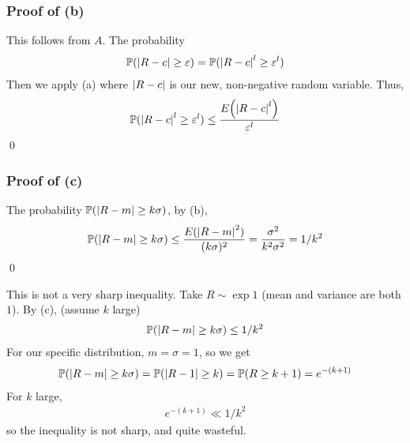 \subsubsection{Proof of (b)}
This follows from $A$. The probability
\begin{align}
    \mathbb{P}(\abs{R-c} \ge \varepsilon) = \mathbb{P}(\abs{R-c}^l \ge \varepsilon^l)
\end{align}
Then we apply (a) where $\abs{R - c}$ is our new, non-negative random variable. Thus,
\begin{align}
    \mathbb{P}(\abs{R-c}^l \ge \varepsilon^l) \le \frac{E\qty(\abs{R-c}^l)}{\varepsilon^l}
\end{align}
\qed

\subsubsection{Proof of (c)}
The probability $\mathbb{P}(\abs{R-m} \ge k\sigma)$, by (b),
\begin{align}
    \mathbb{P}(\abs{R-m} \ge k\sigma) \le \frac{E(\abs{R-m}^2)}{(k\sigma)^2} = \frac{\sigma^2}{k^2\sigma^2} = 1/k^2
\end{align}
\qed

\begin{aside}
    This is not a very sharp inequality. Take $R \sim \exp{1}$ (mean and variance are both $1$). By (c), (assume $k$ large)
    \begin{align}
        \mathbb{P}(\abs{R-m} \ge k\sigma) \le 1/k^2
    \end{align}
    For our specific distribution, $m= \sigma = 1$, so we get 
    \begin{align}
        \mathbb{P}(\abs{R - m} \ge k\sigma) = \mathbb{P}(\abs{R - 1} \ge k) = \mathbb{P}(R \ge k + 1) = e^{-(k+1)}
    \end{align}
    For $k$ large,
    \begin{align}
        e^{-(k+1)} \ll 1/k^2
    \end{align}
    so the inequality is not sharp, and quite wasteful.
\end{aside}


